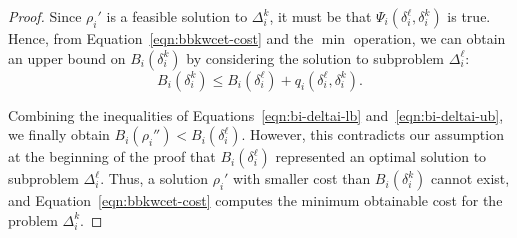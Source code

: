 \begin{proof}
Since $\rho_{i}'$ is a feasible solution to $\Delta_i^k$, it must be that $\Psi_i(\delta_i^{\ell}, \delta_i^k)$ is true.  Hence, from Equation~\ref{eqn:bbkwcet-cost} and the $\min$ operation, we can obtain an upper bound on $B_i(\delta_i^k)$ by considering the solution to subproblem $\Delta_i^{\ell}$:
\begin{equation}\label{eqn:bi-deltai-ub}
    B_i(\delta_i^k) \leq B_i(\delta_i^{\ell}) + q_i(\delta_i^{\ell}, \delta_i^k).
\end{equation}

Combining the inequalities of Equations~\ref{eqn:bi-deltai-lb} and~\ref{eqn:bi-deltai-ub}, we finally obtain $B_i(\rho_{i}'') < B_i(\delta_i^{\ell})$.  However, this contradicts our assumption at the beginning of the proof that $B_i(\delta_i^{\ell})$ represented an optimal solution to subproblem $\Delta_i^{\ell}$.  Thus, a solution $\rho_{i}'$ with smaller cost than $B_i(\delta_i^k)$ cannot exist, and Equation~\ref{eqn:bbkwcet-cost} computes the minimum obtainable cost for the problem $\Delta_i^k$.
\end{proof}
